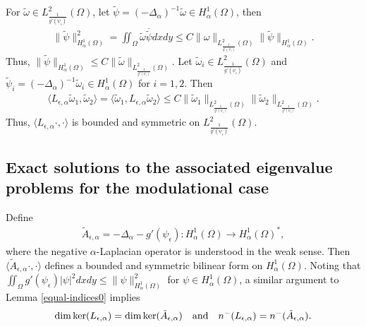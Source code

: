 \documentclass[1 [leqno, 11pt]{amsart}
\numberwithin{equation}{section}
\let\ep=\epsilon
\newtheorem{lemma}[Theorem]{Lemma}
\begin{document}
\begin{CJK*}{GBK}{song}
For $\widetilde{\omega} \in L^2_{\frac{1}{g'(\psi_\ep)}}(\Omega)$, let $\widetilde{\psi}=(-\Delta_\alpha)^{-1}\widetilde{\omega}\in H_\alpha^1(\Omega)$, then
\begin{align*}
\|\widetilde{\psi}\|_{H_\alpha^1(\Omega)}^2=\iint_\Omega \widetilde{\omega} \overline{\widetilde{\psi}} dxdy
 \leq C\|\omega\|_{L^2_{\frac{1}{g'(\psi_\ep)}}(\Omega)} \|\widetilde{\psi}\|_{H_\alpha^1(\Omega)}.
\end{align*}
Thus, $\|\widetilde{\psi}\|_{H_\alpha^1(\Omega)}\leq C \|\widetilde{\omega}\|_{L^2_{\frac{1}{g'(\psi_\ep)}}(\Omega)}$. Let $\widetilde\omega_i\in L^2_{\frac{1}{g'(\psi_\ep)}}(\Omega)$ and $\widetilde{\psi}_i=(-\Delta_\alpha)^{-1}\widetilde{\omega}_i\in H_\alpha^1(\Omega)$ for $i=1,2$. Then
\begin{align}\label{L-alpha-bounded}
\langle L_{\ep,\alpha} \widetilde{\omega}_1, \widetilde{\omega}_2 \rangle=
 \langle  \widetilde{\omega}_1, L_{\ep,\alpha}\widetilde{\omega}_2 \rangle
 \leq C\|\widetilde{\omega}_1\|_{L^2_{\frac{1}{g'(\psi_\ep)}}(\Omega)}\|\widetilde{\omega}_2\|_{L^2_{\frac{1}{g'(\psi_\ep)}}(\Omega)}.
\end{align}
Thus, $
 \langle L_{\ep,\alpha}\cdot,\cdot\rangle$
is bounded and symmetric  on $L^2_{\frac{1}{g'(\psi_\ep)}}(\Omega)$.



\subsection{Exact solutions to the associated eigenvalue problems  for the  modulational case}

Define
 \begin{align*}
 \tilde{A}_{\ep,\alpha}=-\Delta_\alpha-g'(\psi_\ep): H_\alpha^1(\Omega) \rightarrow H_\alpha^{1}(\Omega)^*,
\end{align*}
where the negative $\alpha$-Laplacian operator is understood in the weak sense.
Then
$
 \langle\tilde{A}_{\ep,\alpha}\cdot,\cdot\rangle
$
defines a  bounded and symmetric bilinear form on $H_\alpha^{1}(\Omega)$. Noting that $\iint_{\Omega}g'(\psi_\ep)|\psi|^2dxdy\leq \|\psi\|_{H_\alpha^1(\Omega)}^2$ for $\psi\in H_\alpha^1(\Omega)$, a
similar argument to Lemma \ref{equal-indices0} implies
\begin{align*}
\dim\ker(L_{\ep,\alpha})=\dim\ker(\tilde{A}_{\ep,\alpha}) \quad {\rm{and}} \quad n^-(L_{\ep,\alpha})=n^-(\tilde{A}_{\ep,\alpha}).
\end{align*}


\end{CJK*}
\end{document}
